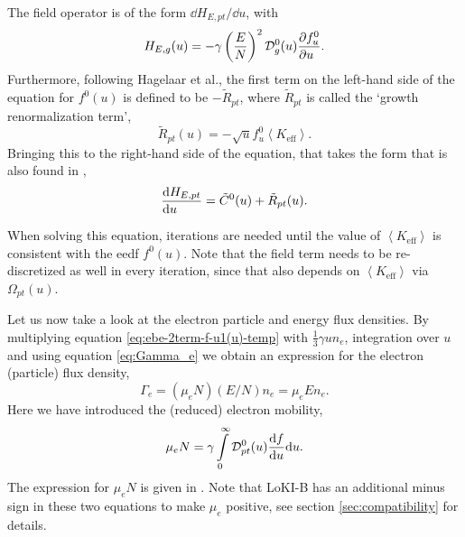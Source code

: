\documentclass{book}
\newcommand{\MEAN}[1]{\ensuremath{\!\left\langle{{#1}}\right\rangle}}
\begin{document}
The field operator is of the form $\dd{H_{E,pt}}/\dd{u}$, with
\begin{equation}
	H_{E,g}(u) = - \gamma\left(\frac{E}{N}\right)^2{\cal D}_{g}^0(u)\PDEV{f^0_u}{u}.
	\label{eq:H_E,g}
\end{equation}
Furthermore, following Hagelaar et al., the first term on the left-hand side of
the equation for $f^0(u)$ is defined to be $-\tilde{R}_{pt}$, where
$\tilde{R}_{pt}$ is called the `growth renormalization term',
\begin{equation}
	\tilde{R}_{pt}(u) = -\sqrt{u}f^0_u\MEAN{K_{\text{eff}}}.
	\label{eq:R_pt}
\end{equation}
Bringing this to the right-hand side of the equation, that takes the form that is also
found in \cite[eq. 25]{Hagelaar2005},
\begin{equation}
	\DERIV{H_{E,pt}}{u} = \tilde{C}^0(u) + \tilde{R}_{pt}(u).
	\label{eq:EBE-temp-growth}
\end{equation}

When solving this equation, iterations are needed until the value of
$\MEAN{K_{\text{eff}}}$ is consistent with the eedf $f^0(u)$. Note that
the field term needs to be re-discretized as well in every iteration,
since that also depends on $\MEAN{K_{\text{eff}}}$ via $\Omega_{pt}(u)$.

Let us now take a look at the electron particle and energy flux densities.
By multiplying equation \eqref{eq:ebe-2term-f-u1(u)-temp} with $\frac{1}{3}\gamma u n_e$,
integration over $u$ and using equation \eqref{eq:Gamma_e} we obtain an
expression for the electron (particle) flux density,
\begin{equation}
	\Gamma_e = (\mu_eN)(E/N)n_e = \mu_eE n_e.
	\label{eq:Gamma_e-temp}
\end{equation}
Here we have introduced the (reduced) electron mobility,
\begin{equation}
	\mu_eN = \gamma\int\limits_0^\infty {\cal D}_{pt}^0(u)\DERIV{f}{u}\dd{u}.
	\label{eq:mueN}
\end{equation}
The expression for $\mu_eN$ is given in \cite[eq. 46b]{Manual_2_2_0}.
Note that LoKI-B has an additional minus sign in these two equations to make $\mu_e$ positive,
see section \ref{sec:compatibility} for details.
\end{document}
